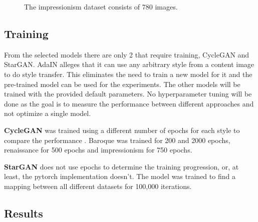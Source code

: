 \begin{figure}
	\centering
	\caption{The impressionism dataset consists of 780 images.}
	\label{fig:impressionism_style_transfer_dataset}
\end{figure}

\subsection{Training}
\label{sec:baseline_training_style_transfer}
From the selected models there are only 2 that require training, CycleGAN and StarGAN.
AdaIN alleges that it can use any arbitrary style from a content image to do style transfer.
This eliminates the need to train a new model for it and the pre-trained model can be used for the experiments.
The other models will be trained with the provided default parameters.
No hyperparameter tuning will be done as the goal is to measure the performance between different approaches and not optimize a single model.

\textbf{CycleGAN} was trained using a different number of epochs for each style to compare the performance .
Baroque was trained for 200 and 2000 epochs, renaissance for 500 epochs and impressionism for 750 epochs.

\textbf{StarGAN} does not use epochs to determine the training progression, or, at least, the pytorch implementation doesn't.
The model was trained to find a mapping between all different datasets for 100,000 iterations.

\subsection{Results}
\label{sec:baseline_results_style_transfer}
